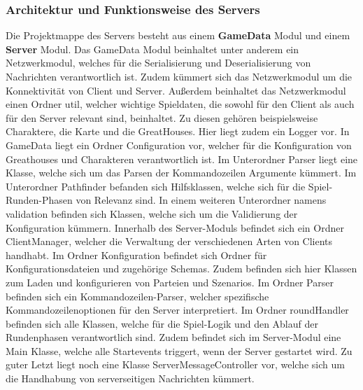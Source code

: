 \documentclass[12pt]{article}
\newcounter{fa}
\begin{document}
\subsubsection{Architektur und Funktionsweise des Servers}
Die Projektmappe des Servers besteht aus einem \textbf{GameData} Modul und einem \textbf{Server} Modul. Das GameData Modul beinhaltet unter anderem ein Netzwerkmodul, welches für die Serialisierung und Deserialisierung von Nachrichten verantwortlich ist. Zudem kümmert sich das Netzwerkmodul um die Konnektivität von Client und Server. Außerdem beinhaltet das Netzwerkmodul einen Ordner util, welcher wichtige Spieldaten, die sowohl für den Client als auch für den Server relevant sind, beinhaltet. Zu diesen gehören beispielsweise Charaktere, die Karte und die GreatHouses. Hier liegt zudem ein Logger vor. In GameData liegt ein Ordner Configuration vor, welcher für die Konfiguration von Greathouses und Charakteren verantwortlich ist. Im Unterordner Parser liegt eine Klasse, welche sich um das Parsen der Kommandozeilen Argumente kümmert. Im Unterordner Pathfinder befanden sich Hilfsklassen, welche sich für die Spiel-Runden-Phasen von Relevanz sind. In einem weiteren Unterordner namens validation befinden sich Klassen, welche sich um die Validierung der Konfiguration kümmern. Innerhalb des Server-Moduls befindet sich ein Ordner ClientManager, welcher die Verwaltung der verschiedenen Arten von Clients handhabt. Im Ordner Konfiguration befindet sich Ordner für Konfigurationsdateien und zugehörige Schemas. Zudem befinden sich hier Klassen zum Laden und konfigurieren von Parteien und Szenarios. Im Ordner Parser befinden sich ein Kommandozeilen-Parser, welcher spezifische Kommandozeilenoptionen für den Server interpretiert. Im Ordner roundHandler befinden sich alle Klassen, welche für die Spiel-Logik und den Ablauf der Rundenphasen verantwortlich sind. Zudem befindet sich im Server-Modul eine Main Klasse, welche alle Startevents triggert, wenn der Server gestartet wird. Zu guter Letzt liegt noch eine Klasse ServerMessageController vor, welche sich um die Handhabung von serverseitigen Nachrichten kümmert.
\end{document}
